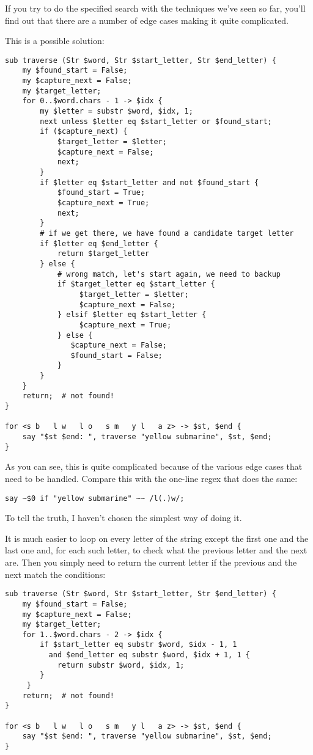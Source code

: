If you try to do the specified search with the techniques 
we've seen so far, you'll find out that there are a number 
of edge cases making it quite complicated.

This is a possible solution:

\begin{verbatim}
sub traverse (Str $word, Str $start_letter, Str $end_letter) {
    my $found_start = False;
    my $capture_next = False;
    my $target_letter;
    for 0..$word.chars - 1 -> $idx {
        my $letter = substr $word, $idx, 1;
        next unless $letter eq $start_letter or $found_start;
        if ($capture_next) {
            $target_letter = $letter;
            $capture_next = False;
            next;
        }
        if $letter eq $start_letter and not $found_start {
            $found_start = True;
            $capture_next = True;
            next;
        }
        # if we get there, we have found a candidate target letter
        if $letter eq $end_letter {
            return $target_letter
        } else {
            # wrong match, let's start again, we need to backup
            if $target_letter eq $start_letter {
                 $target_letter = $letter;
                 $capture_next = False;
            } elsif $letter eq $start_letter {
                 $capture_next = True;
            } else {
               $capture_next = False;
               $found_start = False;
            } 
        } 
    }
    return;  # not found!
}          

for <s b   l w   l o   s m   y l   a z> -> $st, $end {
    say "$st $end: ", traverse "yellow submarine", $st, $end;  
}
\end{verbatim}

As you can see, this is quite complicated because of 
the various edge cases that need to be handled. Compare this with 
the one-line regex that does the same:

\begin{verbatim}
say ~$0 if "yellow submarine" ~~ /l(.)w/;
\end{verbatim}

To tell the truth, I haven't chosen the simplest way of 
doing it.

It is much easier to loop on every letter of the string 
except the first one and the last one and, for each such 
letter, to check what the previous letter and the next 
are. Then you simply need to return the current letter if 
the previous and the next match the conditions:

\begin{verbatim}
sub traverse (Str $word, Str $start_letter, Str $end_letter) {
    my $found_start = False;
    my $capture_next = False;
    my $target_letter;
    for 1..$word.chars - 2 -> $idx {
        if $start_letter eq substr $word, $idx - 1, 1
          and $end_letter eq substr $word, $idx + 1, 1 {
            return substr $word, $idx, 1;
        }
     }
    return;  # not found!
}          

for <s b   l w   l o   s m   y l   a z> -> $st, $end {
    say "$st $end: ", traverse "yellow submarine", $st, $end;  
}
\end{verbatim}

